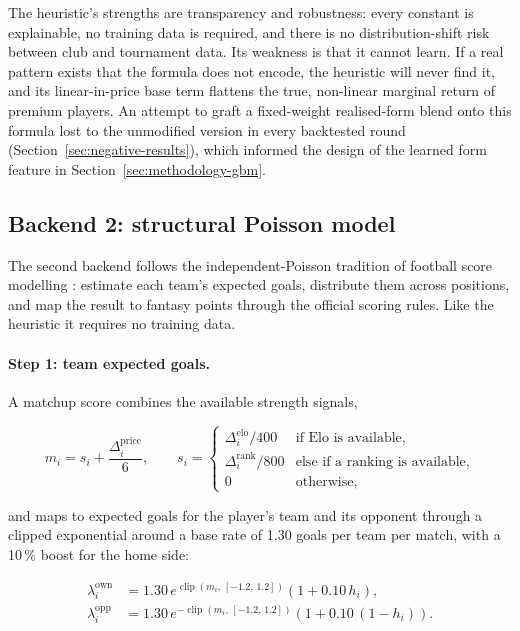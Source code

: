 The heuristic's strengths are transparency and robustness: every
constant is explainable, no training data is required, and there is
no distribution-shift risk between club and tournament data. Its
weakness is that it cannot learn. If a real pattern exists that the
formula does not encode, the heuristic will never find it, and its
linear-in-price base term flattens the true, non-linear marginal
return of premium players. An attempt to graft a fixed-weight
realised-form blend onto this formula lost to the unmodified version
in every backtested round (Section~\ref{sec:negative-results}), which
informed the design of the learned form feature in
Section~\ref{sec:methodology-gbm}.

\subsection{Backend 2: structural Poisson model}
\label{sec:methodology-poisson}

The second backend follows the independent-Poisson tradition of
football score modelling \citep{maher1982modelling,
dixon1997modelling}: estimate each team's expected goals, distribute
them across positions, and map the result to fantasy points through
the official scoring rules. Like the heuristic it requires no
training data.

\paragraph{Step 1: team expected goals.}
A matchup score combines the available strength signals,

\begin{equation}
m_i = s_i + \frac{\Delta^{\mathrm{price}}_i}{6},
\qquad
s_i =
\begin{cases}
\Delta^{\mathrm{elo}}_i / 400 & \text{if Elo is available,}\\[2pt]
\Delta^{\mathrm{rank}}_i / 800 & \text{else if a ranking is
  available,}\\[2pt]
0 & \text{otherwise,}
\end{cases}
\label{eq:poisson-matchup}
\end{equation}

and maps to expected goals for the player's team and its opponent
through a clipped exponential around a base rate of 1.30 goals per
team per match, with a 10\,\% boost for the home side:

\begin{align}
\lambda^{\mathrm{own}}_i &= 1.30\,
  e^{\operatorname{clip}(m_i,\, [-1.2,\, 1.2])}
  \left(1 + 0.10\, h_i\right),
\label{eq:poisson-own}\\
\lambda^{\mathrm{opp}}_i &= 1.30\,
  e^{-\operatorname{clip}(m_i,\, [-1.2,\, 1.2])}
  \left(1 + 0.10\, (1 - h_i)\right).
\label{eq:poisson-opp}
\end{align}

